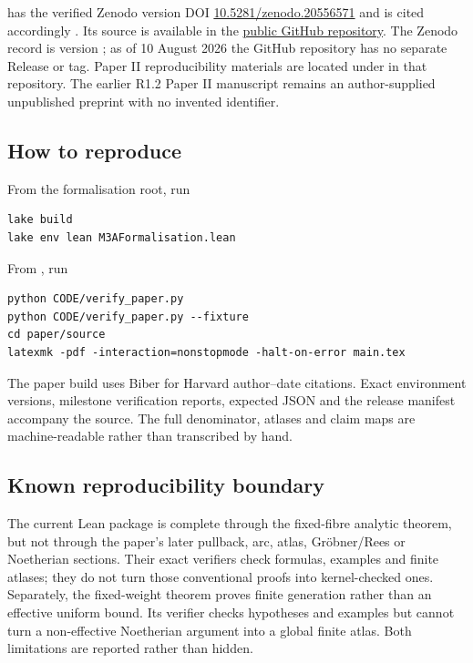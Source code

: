 \paperone{} has the verified Zenodo version DOI
\href{https://doi.org/10.5281/zenodo.20556571}{10.5281/zenodo.20556571} and is
cited accordingly \parencite{MedfordPaperI}.  Its source is available in the
\href{https://github.com/SLresearch74/Signed-Involution-Sector-Exclusion-for-EZT-in-Finite-Magnetic-Graph-Hamiltonians---v1.0.0}{public GitHub repository}.
The Zenodo record is version ; as of 10 August 2026 the GitHub
repository has no separate Release or tag.  Paper II reproducibility materials
are located under
 in that repository.  The earlier
R1.2 Paper II manuscript remains an author-supplied unpublished preprint with
no invented identifier.

\subsection{How to reproduce}

From the formalisation root, run
\begin{verbatim}
lake build
lake env lean M3AFormalisation.lean
\end{verbatim}
From , run
\begin{verbatim}
python CODE/verify_paper.py
python CODE/verify_paper.py --fixture
cd paper/source
latexmk -pdf -interaction=nonstopmode -halt-on-error main.tex
\end{verbatim}
The paper build uses Biber for Harvard author--date citations.  Exact
environment versions, milestone verification reports, expected JSON and the
release manifest accompany the source.  The full denominator, atlases and
claim maps are machine-readable rather than transcribed by hand.

\subsection{Known reproducibility boundary}

The current Lean package is complete through the fixed-fibre analytic theorem,
but not through the paper's later pullback, arc, atlas, Gr\"obner/Rees or
Noetherian sections.  Their exact verifiers check formulas, examples and finite
atlases; they do not turn those conventional proofs into kernel-checked ones.
Separately, the fixed-weight theorem proves finite generation rather than an
effective uniform bound.  Its verifier checks hypotheses and examples but
cannot turn a non-effective Noetherian argument into a global finite atlas.
Both limitations are reported rather than hidden.
